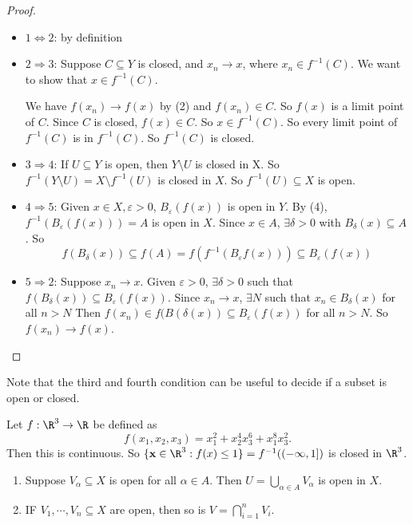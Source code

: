 \documentclass[a4paper]{article}
\begin{document}
\begin{proof}\leavevmode
  \begin{itemize}
    \item $1 \Leftrightarrow 2$: by definition
    \item $2 \Rightarrow 3$: Suppose $C\subseteq Y$ is closed, and $x_n \to x$, where $x_n \in f^{-1}(C)$. We want to show that $x\in f^{-1}(C)$.
      
      We have $f(x_n) \to f(x)$ by (2) and $f(x_n) \in C$. So $f(x)$ is a limit point of $C$. Since $C$ is closed, $f(x) \in C$. So $x\in f^{-1}(C)$. So every limit point of $f^{-1}(C)$ is in $f^{-1}(C)$. So $f^{-1}(C)$ is closed.
    \item $3 \Rightarrow 4$: If $U\subseteq Y$ is open, then $Y\setminus U$ is closed in X. So $f^{-1}(Y\setminus U) = X\setminus f^{-1}(U)$ is closed in $X$. So $f^{-1}(U)\subseteq X$ is open.

    \item $4 \Rightarrow 5$: Given $x\in X, \varepsilon > 0$, $B_\varepsilon(f(x))$ is open in $Y$. By (4), $f^{-1}(B_\varepsilon(f(x))) = A$ is open in $X$. Since $x\in A$, $\exists \delta > 0$ with $B_\delta (x) \subseteq A$. So
      \[
        f(B_\delta(x)) \subseteq f(A) = f(f^{-1}(B_\varepsilon f(x))) \subseteq B_\varepsilon (f(x))
      \]
    \item $5 \Rightarrow 2$: Suppose $x_n \to x$. Given $\varepsilon > 0$, $\exists \delta > 0$ such that $f(B_\delta(x)) \subseteq B_\varepsilon(f(x))$. Since $x_n \to x$, $\exists N$ such that $x_n \in B_\delta (x)$ for all $n  > N$ Then $f(x_n) \in f(B(\delta(x))\subseteq B_\varepsilon(f(x))$ for all $n > N$. So $f(x_n) \to f(x)$.
  \end{itemize}
\end{proof}

Note that the third and fourth condition can be useful to decide if a subset is open or closed.

\begin{eg}
  Let $f: \R^3 \to \R$ be defined as
  \[
    f(x_1, x_2, x_3) = x_1^2 + x_2^4 x_3^6 + x_1^8 x_3^2.
  \]
  Then this is continuous. So $\{\mathbf{x}\in \R^3: f(x) \leq 1\} = f^{-1}((-\infty, 1])$ is closed in $\R^3$.
\end{eg}

\begin{lemma}\leavevmode
  \begin{enumerate}
    \item Suppose $V_\alpha \subseteq X$ is open for all $\alpha \in A$. Then $\displaystyle U = \bigcup_{\alpha \in A}V_\alpha$ is open in $X$.
    \item IF $V_1, \cdots, V_n\subseteq X$ are open, then so is $\displaystyle V = \bigcap_{i = 1}^n V_i$.
  \end{enumerate}
\end{lemma}
\end{document}
